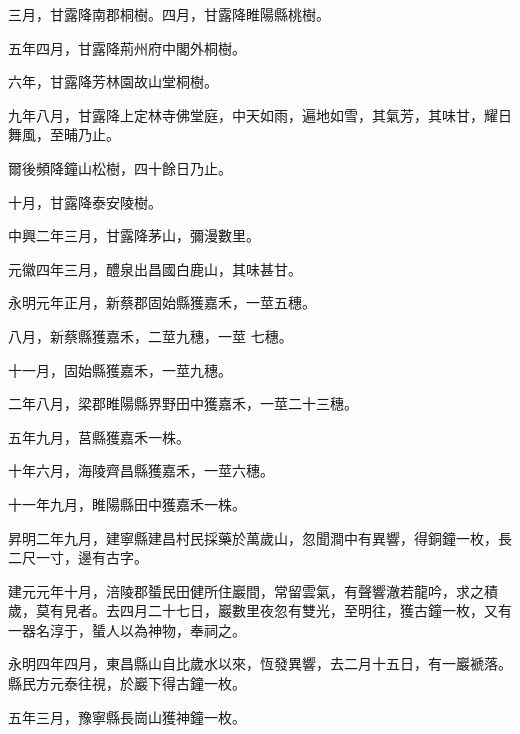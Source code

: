 \begin{pinyinscope}
 三月，甘露降南郡桐樹。四月，甘露降睢陽縣桃樹。



 五年四月，甘露降荊州府中閣外桐樹。



 六年，甘露降芳林園故山堂桐樹。



 九年八月，甘露降上定林寺佛堂庭，中天如雨，遍地如雪，其氣芳，其味甘，耀日舞風，至晡乃止。



 爾後頻降鐘山松樹，四十餘日乃止。



 十月，甘露降泰安陵樹。



 中興二年三月，甘露降茅山，彌漫數里。



 元徽四年三月，醴泉出昌國白鹿山，其味甚甘。



 永明元年正月，新蔡郡固始縣獲嘉禾，一莖五穗。



 八月，新蔡縣獲嘉禾，二莖九穗，一莖
 七穗。



 十一月，固始縣獲嘉禾，一莖九穗。



 二年八月，梁郡睢陽縣界野田中獲嘉禾，一莖二十三穗。



 五年九月，莒縣獲嘉禾一株。



 十年六月，海陵齊昌縣獲嘉禾，一莖六穗。



 十一年九月，睢陽縣田中獲嘉禾一株。



 昇明二年九月，建寧縣建昌村民採藥於萬歲山，忽聞澗中有異響，得銅鐘一枚，長二尺一寸，邊有古字。



 建元元年十月，涪陵郡蜑民田健所住巖間，常留雲氣，有聲響澈若龍吟，求之積歲，莫有見者。去四月二十七日，巖數里夜忽有雙光，至明往，獲古鐘一枚，又有一器名淳于，蜑人以為神物，奉祠之。



 永明四年四月，東昌縣山自比歲水以來，恆發異響，去二月十五日，有一巖褫落。縣民方元泰往視，於巖下得古鐘一枚。



 五年三月，豫寧縣長崗山獲神鐘一枚。




\end{pinyinscope}

